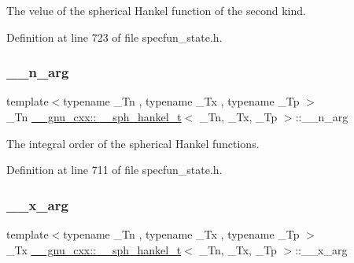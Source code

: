 The velue of the spherical Hankel function of the second kind. 



Definition at line 723 of file specfun\+\_\+state.\+h.

\mbox{\label{struct____gnu__cxx_1_1____sph__hankel__t_a43f671e87375a9077262676564df20c5}} 
\subsubsection{\texorpdfstring{\+\_\+\+\_\+n\+\_\+arg}{\_\_n\_arg}}
{\footnotesize\ttfamily template$<$typename \+\_\+\+Tn , typename \+\_\+\+Tx , typename \+\_\+\+Tp $>$ \\
\+\_\+\+Tn \hyperlink{struct____gnu__cxx_1_1____sph__hankel__t}{\+\_\+\+\_\+gnu\+\_\+cxx\+::\+\_\+\+\_\+sph\+\_\+hankel\+\_\+t}$<$ \+\_\+\+Tn, \+\_\+\+Tx, \+\_\+\+Tp $>$\+::\+\_\+\+\_\+n\+\_\+arg}



The integral order of the spherical Hankel functions. 



Definition at line 711 of file specfun\+\_\+state.\+h.

\mbox{\label{struct____gnu__cxx_1_1____sph__hankel__t_a265ee0cdcca2d491c29b520a0fd4e4b3}} 
\subsubsection{\texorpdfstring{\+\_\+\+\_\+x\+\_\+arg}{\_\_x\_arg}}
{\footnotesize\ttfamily template$<$typename \+\_\+\+Tn , typename \+\_\+\+Tx , typename \+\_\+\+Tp $>$ \\
\+\_\+\+Tx \hyperlink{struct____gnu__cxx_1_1____sph__hankel__t}{\+\_\+\+\_\+gnu\+\_\+cxx\+::\+\_\+\+\_\+sph\+\_\+hankel\+\_\+t}$<$ \+\_\+\+Tn, \+\_\+\+Tx, \+\_\+\+Tp $>$\+::\+\_\+\+\_\+x\+\_\+arg}



